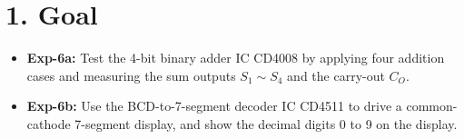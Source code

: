 \section*{1. Goal}
\begin{itemize}[leftmargin=*]
    \item \textbf{Exp-6a:} Test the 4-bit binary adder IC CD4008 by applying four addition cases and measuring the sum outputs $S_1 \sim S_4$ and the carry-out $C_O$.
    \item \textbf{Exp-6b:} Use the BCD-to-7-segment decoder IC CD4511 to drive a common-cathode 7-segment display, and show the decimal digits 0 to 9 on the display.
\end{itemize}
